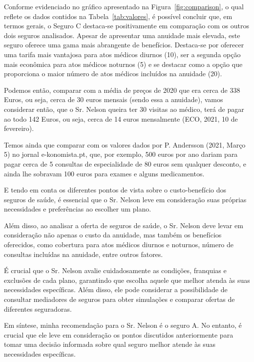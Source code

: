 \documentclass{report}
\begin{document}
Conforme evidenciado no gráfico apresentado na Figura~\ref{fig:comparison}, o qual reflete os dados contidos na Tabela~\ref{tab:valores}, é possível concluir que, em termos gerais, o Seguro C destaca-se positivamente em comparação com os outros dois seguros analisados. Apesar de apresentar uma anuidade mais elevada, este seguro oferece uma gama mais abrangente de benefícios. Destaca-se por oferecer uma tarifa mais vantajosa para atos médicos diurnos (10), ser a segunda opção mais econômica para atos médicos noturnos (5) e se destacar como a opção que proporciona o maior número de atos médicos incluídos na anuidade (20).

Podemos então, comparar com a média de preços de 2020 que era cerca de 338 Euros, ou seja, cerca de 30 euros mensais (sendo essa a anuidade), vamos considerar então, que o Sr. Nelson queira ter 30 visitas ao médico, terá de pagar ao todo 142 Euros, ou seja, cerca de 14 euros mensalmente (ECO, 2021, 10 de fevereiro).

Temos ainda que comparar com os valores dados por P. Andersson (2021, Março 5) no jornal e-konomista.pt, que, por exemplo, 500 euros por ano dariam para pagar cerca de 5 consultas de especialidade de 80 euros sem qualquer desconto, e ainda lhe sobravam 100 euros para exames e alguns medicamentos.

E tendo em conta os diferentes pontos de vista sobre o custo-benefício dos seguros de saúde, é essencial que o Sr. Nelson leve em consideração suas próprias necessidades e preferências ao escolher um plano.

Além disso, ao analisar a oferta de seguros de saúde, o Sr. Nelson deve levar em consideração não apenas o custo da anuidade, mas também os benefícios oferecidos, como cobertura para atos médicos diurnos e noturnos, número de consultas incluídas na anuidade, entre outros fatores.

É crucial que o Sr. Nelson avalie cuidadosamente as condições, franquias e exclusões de cada plano, garantindo que escolha aquele que melhor atenda às suas necessidades específicas. Além disso, ele pode considerar a possibilidade de consultar mediadores de seguros para obter simulações e comparar ofertas de diferentes seguradoras.

Em síntese, minha recomendação para o Sr. Nelson é o seguro A. No entanto, é crucial que ele leve em consideração os pontos discutidos anteriormente para tomar uma decisão informada sobre qual seguro melhor atende às suas necessidades específicas.
\end{document}
